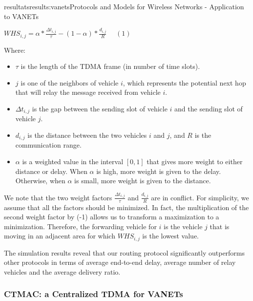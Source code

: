 \documentclass{ra2016}
\begin{document}
\begin{module}{resultats}{results:vanets}{Protocols and Models for Wireless Networks - Application to VANETs}
\begin{center}
    \vspace{2mm}
    $WHS_{i,j}=\alpha*\frac{\Delta t_{i,j}}{\tau}-(1-\alpha)*\frac{d_{i,j}}{R}~~~~~~(1)$ 
    \vspace{2mm}
\end{center}

Where:

\begin{itemize}
    \item $\tau$ is the length of the TDMA frame (in number of time slots).
    \item $j$ is one of the neighbors of vehicle $i$, which represents the potential next hop that will relay the message received from vehicle $i$.
    \item $\Delta t_{i,j}$ is the gap between the sending slot of vehicle $i$ and the sending slot of vehicle $j$.
    \item $d_{i,j}$ is the distance between the two vehicles $i$ and $j$, and $R$ is the communication range. 
    \item $\alpha$ is a weighted value in the interval $[0,1]$ that gives more weight to either distance or delay. When $\alpha$ is high, more weight is given to the delay. Otherwise, when $\alpha$ is small, more weight is given to the distance.
\end{itemize}

We note that the two weight factors $\frac{\Delta t_{i,j}}{\tau}$ and $\frac{d_{i,j}}{R}$ are in conflict. For simplicity, we assume 
that all the factors should be minimized. In fact, the multiplication of the second weight factor
by (-1) allows us to transform a maximization to a minimization. Therefore, the forwarding vehicle for $i$ is the 
vehicle $j$ that is moving in an adjacent area for which $WHS_{i,j}$ is the lowest value.

The simulation results reveal that our routing protocol significantly outperforms other
protocols in terms of average end-to-end delay, average number
of relay vehicles and the average delivery ratio.

\subsubsection{CTMAC: a Centralized TDMA for VANETs}

\begin{participants}
\end{participants}
    

\end{module}
\end{document}
